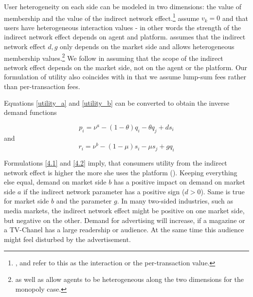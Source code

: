 \documentclass[10pt,a4paper]{scrreprt}
\begin{document}
User heterogeneity on each side can be modeled in two dimensions: the value of membership and the value of the indirect network effect.\footnote{\cite{weyl_price_2010}, \cite{rochet_platform_2003} and \cite{armstrong_competition_2006} refer to this as the interaction or the per-transaction value.} \cite{rochet_platform_2003} assume $v_k=0$ and that users have heterogeneous interaction values - in other words the strength of the indirect network effect depends on agent and platform. \cite{armstrong_competition_2006} assumes that the indirect network effect $d,g$ only depends on the market side and allows heterogeneous membership values.\footnote{\cite{rochet_platform_2003} as well as \cite{weyl_price_2010} allow agents to be heterogeneous along the two dimensions for the monopoly case.} We follow \cite{armstrong_competition_2006} in assuming that the scope of the indirect network effect depends on the market side, not on the agent or the platform. Our formulation of utility also coincides with \cite{armstrong_competition_2006} in that we assume lump-sum fees rather than per-transaction fees. 

Equations \ref{utility_a} and \ref{utility_b} can be converted to obtain the inverse demand functions

\begin{equation}
p_i=\nu^a-(1-\theta) q_i - \theta q_j +ds_i
\end{equation}
and
\begin{equation}
r_i=\nu^b-(1-\mu) s_i - \mu s_j +gq_i
\end{equation} 

Formulations \ref{4.1} and \ref{4.2} imply, that consumers utility from the indirect network effect is higher the more she uses the platform (\cite{kind_business_2009}). Keeping everything else equal, demand on market side $b$ has a positive impact on demand on market side $a$ if the indirect network parameter has a positive sign ($d > 0$). Same is true for market side $b$ and the parameter $g$. In many two-sided industries, such as media markets, the indirect network effect might be positive on one market side, but negative on the other. Demand for advertising will increase, if a magazine or a TV-Chanel has a large readership or audience. At the same time this audience might feel disturbed by the advertisement.
\end{document}
